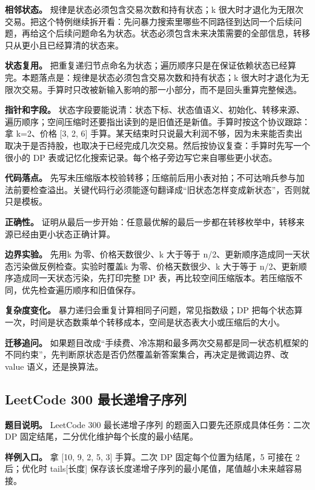 \textbf{相邻状态。} 规律是状态必须包含交易次数和持有状态；k 很大时才退化为无限次交易。把这个特例继续拆开看：先问暴力搜索里哪些不同路径到达同一个后续问题，再给这个后续问题命名为状态。状态必须包含未来决策需要的全部信息，转移只从更小且已经算清的状态来。

\textbf{状态复用。} 把重复递归节点命名为状态；遍历顺序只是在保证依赖状态已经算完。本题落点是：规律是状态必须包含交易次数和持有状态；k 很大时才退化为无限次交易。手算时只改被新输入影响的那一小部分，而不是回头重算完整候选。

\textbf{指针和字段。} 状态字段要能说清：状态下标、状态值语义、初始化、转移来源、遍历顺序；空间压缩时还要指出读到的是旧值还是新值。手算时按这个协议跟踪：拿 k=2、价格 [3, 2, 6] 手算。某天结束时只说最大利润不够，因为未来能否卖出取决于是否持股，也取决于已经完成几次交易。然后按协议复查：手算时先写一个很小的 DP 表或记忆化搜索记录。每个格子旁边写它来自哪些更小状态。

\textbf{代码落点。} 先写未压缩版本校验转移；压缩前后用小表对拍；不可达哨兵参与加法前要检查溢出。关键代码行必须能逐句翻译成“旧状态怎样变成新状态”，否则就只是模板。

\textbf{正确性。} 证明从最后一步开始：任意最优解的最后一步都在转移枚举中，转移来源已经由更小状态正确计算。

\textbf{边界实验。} 先用k 为零、价格天数很少、k 大于等于 n/2、更新顺序造成同一天状态污染做反例检查。实验时覆盖k 为零、价格天数很少、k 大于等于 n/2、更新顺序造成同一天状态污染，先打印完整 DP 表，再比较空间压缩版本。若压缩版不同，优先检查遍历顺序和旧值保存。

\textbf{复杂度变化。} 暴力递归会重复计算相同子问题，常见指数级；DP 把每个状态算一次，时间是状态数乘单个转移成本，空间是状态表大小或压缩后的大小。

\textbf{迁移追问。} 如果题目改成“手续费、冷冻期和最多两次交易都是同一状态机框架的不同约束”，先判断原状态是否仍然覆盖新答案集合，再决定是微调边界、改 value 语义，还是换算法。

\subsection{LeetCode 300 最长递增子序列}

\textbf{题目说明。} LeetCode 300 最长递增子序列 的题面入口要先还原成具体任务：二次 DP 固定结尾，二分优化维护每个长度的最小结尾。

\textbf{样例入口。} 拿 [10, 9, 2, 5, 3] 手算。二次 DP 固定每个位置为结尾，5 可接在 2 后；优化时 tails[长度] 保存该长度递增子序列的最小尾值，尾值越小未来越容易接。

